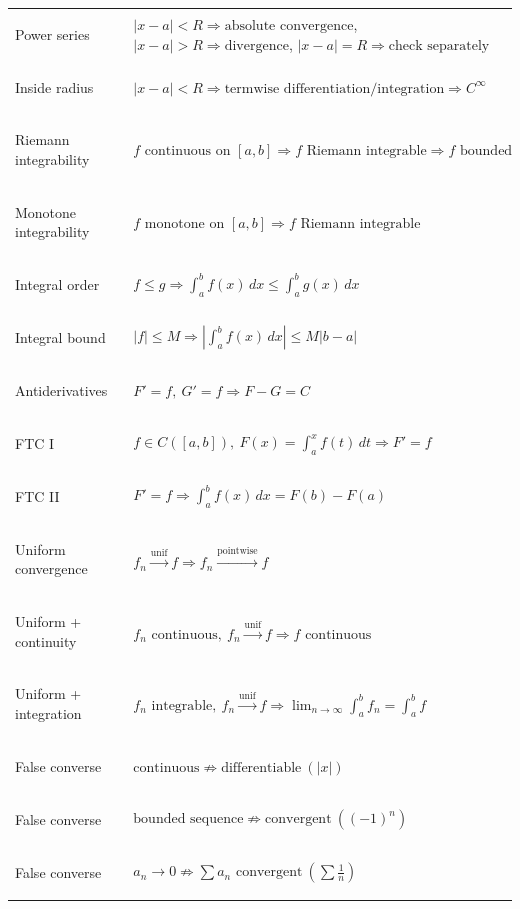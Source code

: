 {\begin{minipage}[t]{0.495\textwidth}
\begin{tabular}{
    @{}
    >{\bfseries\raggedright\arraybackslash}p{2.9cm}
    >{\raggedright\arraybackslash}p{10.5cm}
    @{}
}
Power series &
$|x-a|<R\Rightarrow\text{absolute convergence}$,
\quad
$|x-a|>R\Rightarrow\text{divergence}$,
\quad
$|x-a|=R\Rightarrow\text{check separately}$ \\

Inside radius &
$|x-a|<R
\Rightarrow \text{termwise differentiation/integration}
\Rightarrow C^\infty$ \\

Riemann integrability &
$f\text{ continuous on }[a,b]
\Rightarrow f\text{ Riemann integrable}
\Rightarrow f\text{ bounded}$ \\

Monotone integrability &
$f\text{ monotone on }[a,b]
\Rightarrow f\text{ Riemann integrable}$ \\

Integral order &
$f\le g
\Rightarrow
\int_a^b f(x)\,dx
\le
\int_a^b g(x)\,dx$ \\

Integral bound &
$|f|\le M
\Rightarrow
\left|\int_a^b f(x)\,dx\right|
\le M|b-a|$ \\

Antiderivatives &
$F'=f,\ G'=f
\Rightarrow F-G=C$ \\

FTC I &
$f\in C([a,b]),\
F(x)=\int_a^x f(t)\,dt
\Rightarrow F'=f$ \\

FTC II &
$F'=f
\Rightarrow
\int_a^b f(x)\,dx=F(b)-F(a)$ \\

Uniform convergence &
$f_n\xrightarrow{\mathrm{unif}}f
\Rightarrow
f_n\xrightarrow{\mathrm{pointwise}}f$ \\

Uniform + continuity &
$f_n\text{ continuous},\
f_n\xrightarrow{\mathrm{unif}}f
\Rightarrow f\text{ continuous}$ \\

Uniform + integration &
$f_n\text{ integrable},\
f_n\xrightarrow{\mathrm{unif}}f
\Rightarrow
\displaystyle
\lim_{n\to\infty}\int_a^b f_n
=
\int_a^b f$ \\

\midrule

False converse &
$\text{continuous}\not\Rightarrow\text{differentiable}\ (|x|)$ \\

False converse &
$\text{bounded sequence}\not\Rightarrow\text{convergent}\ ((-1)^n)$ \\

False converse &
$a_n\to0\not\Rightarrow\sum a_n\text{ convergent}\ 
\left(\sum\frac1n\right)$ \\


\end{tabular}
\end{minipage}}
